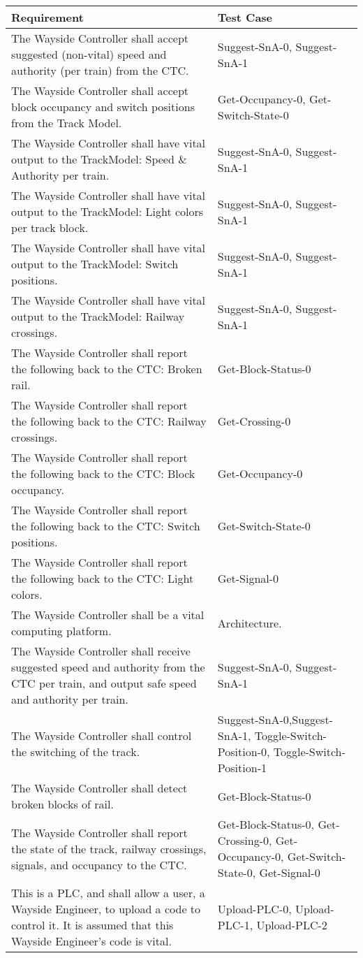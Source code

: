 \documentclass{scrreprt}
\begin{document}
    \begin{center}
            \begin{tabular}{p{} | p{}}
                Requirement & Test Case\\
                \hline\hline
The Wayside Controller shall accept suggested (non-vital) speed and authority (per train) from the CTC. & Suggest-SnA-0, Suggest-SnA-1\\\hline
The Wayside Controller shall accept block occupancy and switch positions from the Track Model. & Get-Occupancy-0, Get-Switch-State-0 \\\hline
The Wayside Controller shall have vital output to the TrackModel: Speed \& Authority per train. & Suggest-SnA-0, Suggest-SnA-1\\\hline
The Wayside Controller shall have vital output to the TrackModel: Light colors per track block. & Suggest-SnA-0, Suggest-SnA-1\\\hline
The Wayside Controller shall have vital output to the TrackModel: Switch positions. & Suggest-SnA-0, Suggest-SnA-1\\\hline
The Wayside Controller shall have vital output to the TrackModel: Railway crossings. & Suggest-SnA-0, Suggest-SnA-1\\\hline

The Wayside Controller shall report the following back to the CTC: Broken rail. & Get-Block-Status-0 \\\hline
The Wayside Controller shall report the following back to the CTC: Railway crossings. & Get-Crossing-0 \\\hline
The Wayside Controller shall report the following back to the CTC: Block occupancy. & Get-Occupancy-0 \\\hline
The Wayside Controller shall report the following back to the CTC: Switch positions. & Get-Switch-State-0\\\hline
The Wayside Controller shall report the following back to the CTC: Light colors. & Get-Signal-0\\\hline
The Wayside Controller shall be a vital computing platform. & Architecture. \\\hline
The Wayside Controller shall receive suggested speed and authority from the CTC
per train, and output safe speed and authority per train. & Suggest-SnA-0, Suggest-SnA-1\\\hline
The Wayside Controller shall control the switching of the track. & Suggest-SnA-0,Suggest-SnA-1, Toggle-Switch-Position-0, Toggle-Switch-Position-1 \\\hline
The Wayside Controller shall detect broken blocks of rail. & Get-Block-Status-0\\\hline
The Wayside Controller shall report the state of the track, railway crossings, signals,
and occupancy to the CTC. & Get-Block-Status-0, Get-Crossing-0, Get-Occupancy-0, Get-Switch-State-0, Get-Signal-0 \\\hline
This is a PLC, and shall allow a user, a Wayside Engineer, to upload a code to
control it. It is assumed that this Wayside Engineer’s code is vital. & Upload-PLC-0, Upload-PLC-1, Upload-PLC-2\\
            \end{tabular}
    \end{center}
\end{document}
